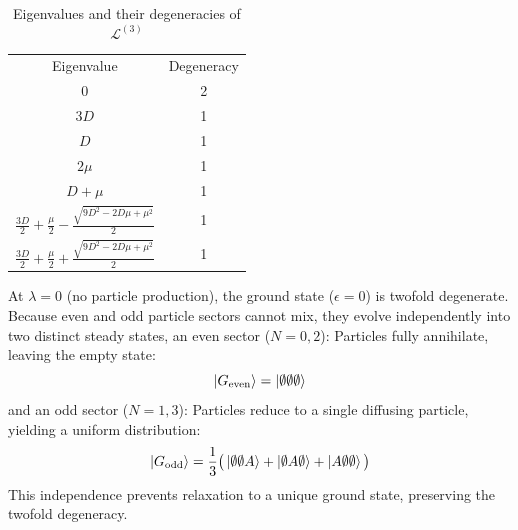 \documentclass{article}
\begin{document}
\begin{table}[h]
\centering
\begin{tabular}{c c}
\hline

Eigenvalue & Degeneracy \\
$0$ & 2 \\
$3 D$ & 1 \\
$D$ & 1 \\
$ 2 \mu$ & 1 \\
$ D + \mu$ & 1 \\
$ \frac{3 D}{2} + \frac{\mu}{2} - \frac{\sqrt{9 D^{2} - 2 D \mu + \mu^{2}}}{2}$ & 1 \\
$ \frac{3 D}{2} + \frac{\mu}{2} + \frac{\sqrt{9 D^{2} - 2 D \mu + \mu^{2}}}{2}$ & 1 \\

\hline
\hline
\end{tabular}
\caption{Eigenvalues and their degeneracies of $\mathcal{L}^{(3)}$}
\end{table}

At $\lambda=0$ (no particle production), the ground state ($\epsilon=0$) is twofold degenerate. Because even and odd particle sectors cannot mix, they evolve independently into two distinct steady states, an even sector ($N=0, 2$): Particles fully annihilate, leaving the empty state:$$\ket{G_{\text{even}}} = \ket{\emptyset\emptyset\emptyset}$$
and an odd sector ($N=1, 3$): Particles reduce to a single diffusing particle, yielding a uniform distribution:$$\ket{G_{\text{odd}}} = \frac{1}{3}\big(\ket{\emptyset\emptyset A} + \ket{\emptyset A\emptyset} + \ket{A\emptyset\emptyset}\big)$$This independence prevents relaxation to a unique ground state, preserving the twofold degeneracy.
\end{document}
